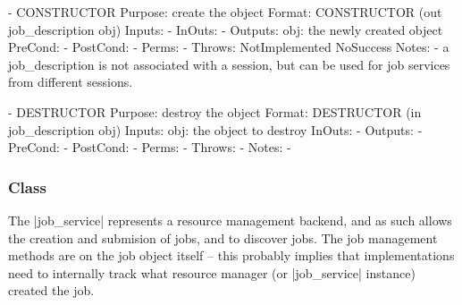  
 \begin{myspec}
    - CONSTRUCTOR
      Purpose:  create the object
      Format:   CONSTRUCTOR       (out job_description obj)
      Inputs:   -
      InOuts:   -
      Outputs:  obj:               the newly created object
      PreCond:  -
      PostCond: -
      Perms:    -
      Throws:   NotImplemented
                NoSuccess
      Notes:    - a job_description is not associated with a
                  session, but can be used for job services
                  from different sessions.
 
 
    - DESTRUCTOR
      Purpose:  destroy the object
      Format:   DESTRUCTOR        (in  job_description obj)
      Inputs:   obj:               the object to destroy
      InOuts:   -
      Outputs:  -
      PreCond:  -
      PostCond: -
      Perms:    -
      Throws:   -
      Notes:    -
 \end{myspec}
 
 
  \subsubsection*{Class }
 
    The |job_service| represents a resource management backend,
    and as such allows the creation and submision of jobs, and
    to discover jobs.  The job management methods are on the job
    object itself -- this probably implies that implementations
    need to internally track what resource manager (or
    |job_service| instance) created the job.
 
